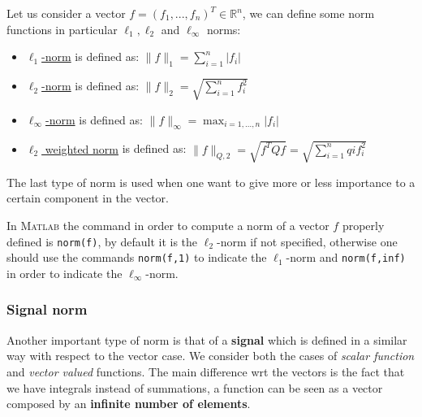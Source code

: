 Let us consider a vector $f=(f_1, ..., f_n)^T\in\mathbb{R}^n$, we can define some norm functions in particular $\ell_1, \ell_2$ and $\ell_\infty$ norms:
\begin{itemize}
    \item \underline{$\ell_1$-norm} is defined as: $\lVert f \rVert_1=\sum_{i=1}^{n}\lvert f_i \rvert$ 
    \item \underline{$\ell_2$-norm} is defined as: 
    $\lVert f \rVert_2=\sqrt{\sum_{i=1}^n f_i^2}$
    \item \underline{$\ell_\infty$-norm} is defined as:
   $ \lVert f \rVert_\infty=\max_{i=1,..., n} \lvert f_i \rvert$
    \item \underline{$\ell_2$ weighted norm} is defined as: 
    $\lVert f \rVert_{Q,2}=\sqrt{f^T Q f}=\sqrt{\sum_{i=1}^n qi f_i^2}$
\end{itemize}
The last type of norm is used when one want to give more or less importance to a certain component in the vector.

{\color{red}In \textsc{Matlab}} the command in order to compute a norm of a vector $f$ properly defined is \texttt{norm(f)}, by default it is the $\ell_2$-norm if not specified, otherwise one should use the commands \texttt{norm(f,1)} to indicate the $\ell_1$-norm and \texttt{norm(f,inf)} in order to indicate the $\ell_\infty$-norm. \\
{\color{blue} \subsubsection{Signal norm}}

Another important type of norm is that of a \textbf{signal} which is defined in a similar way with respect to the vector case. We consider both the cases of \textit{scalar function} and \textit{vector valued} functions. The main difference wrt the vectors is the fact that we have integrals instead of summations, a function can be seen as a vector composed by an \textbf{infinite number of elements}. \\

